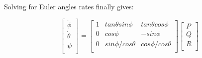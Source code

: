 Solving for Euler angles rates finally gives:

\begin{equation}
\label{S10}
 \begin{bmatrix}
 	\dot{\phi} \\
 	\dot{\theta} \\
 	\dot{\psi} \\
 	\end{bmatrix}=\begin{bmatrix}
 	1 & tan\theta sin\phi & tan\theta cos\phi \\
 	0 & cos\phi & -sin\phi  \\
 	0 & sin\phi / cos\theta & cos\phi / cos\theta  \\
 	\end{bmatrix}\begin{bmatrix}
 	P \\
 	Q \\
 	R \\
 	\end{bmatrix}
 	 \end{equation}